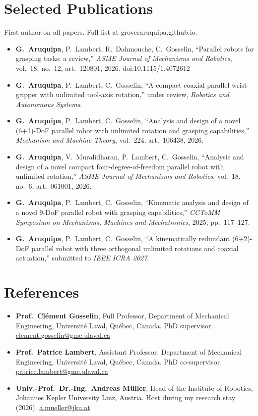 \documentclass[10pt,letterpaper]{article}
\begin{document}
\section{Selected Publications}
{\small First author on all papers. Full list at groveraruquipa.github.io.}\par\vspace{2pt}
\begin{itemize}
\item \textbf{G.~Aruquipa}, P.~Lambert, R.~Dahmouche, C.~Gosselin, ``Parallel robots for grasping tasks: a review,'' \emph{ASME Journal of Mechanisms and Robotics}, vol.~18, no.~12, art.~120801, 2026. doi:10.1115/1.4072612
\item \textbf{G.~Aruquipa}, P.~Lambert, C.~Gosselin, ``A compact coaxial parallel wrist-gripper with unlimited tool-axis rotation,'' under review, \emph{Robotics and Autonomous Systems}.
\item \textbf{G.~Aruquipa}, P.~Lambert, C.~Gosselin, ``Analysis and design of a novel (6+1)-DoF parallel robot with unlimited rotation and grasping capabilities,'' \emph{Mechanism and Machine Theory}, vol.~224, art.~106438, 2026.
\item \textbf{G.~Aruquipa}, V.~Muralidharan, P.~Lambert, C.~Gosselin, ``Analysis and design of a novel compact four-degree-of-freedom parallel robot with unlimited rotation,'' \emph{ASME Journal of Mechanisms and Robotics}, vol.~18, no.~6, art.~061001, 2026.
\item \textbf{G.~Aruquipa}, P.~Lambert, C.~Gosselin, ``Kinematic analysis and design of a novel 9-DoF parallel robot with grasping capabilities,'' \emph{CCToMM Symposium on Mechanisms, Machines and Mechatronics}, 2025, pp.~117--127.
\item \textbf{G.~Aruquipa}, P.~Lambert, C.~Gosselin, ``A kinematically redundant (6+2)-DoF parallel robot with three orthogonal unlimited rotations and coaxial actuation,'' submitted to \emph{IEEE ICRA 2027}.
\end{itemize}

\section{References}
\begin{itemize}
\item \textbf{Prof.~Cl\'ement Gosselin}, Full Professor, Department of Mechanical Engineering, Universit\'e Laval, Qu\'ebec,
Canada. PhD supervisor. \href{mailto:clement.gosselin@gmc.ulaval.ca}{clement.gosselin@gmc.ulaval.ca}
\item \textbf{Prof.~Patrice Lambert}, Assistant Professor, Department of Mechanical Engineering, Universit\'e Laval,
Qu\'ebec, Canada. PhD co-supervisor. \href{mailto:patrice.lambert@gmc.ulaval.ca}{patrice.lambert@gmc.ulaval.ca}
\item \textbf{Univ.-Prof.~Dr.-Ing.~Andreas M\"uller}, Head of the Institute of Robotics, Johannes Kepler University Linz,
Austria. Host during my research stay (2026). \href{mailto:a.mueller@jku.at}{a.mueller@jku.at}
\end{itemize}
\end{document}

